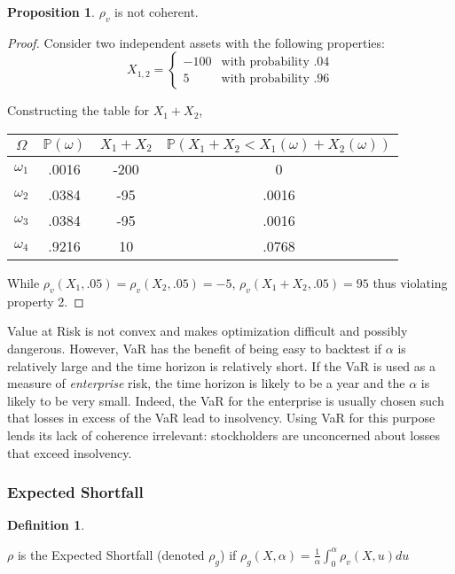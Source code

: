 \documentclass[12pt]{article}
\theoremstyle{definition}
\newtheorem{riskmeasure}{Definition}
\newtheorem{prop}{Proposition}
\begin{document}
\begin{prop}
\(\rho_v\) is not coherent.
\end{prop}
\begin{proof}
Consider two independent assets with the following properties:
\[X_{1, 2}=\begin{cases}
-100 & \text{with probability .04}\\
5 & \text{with probability .96}

\end{cases} \]

Constructing the table for \(X_1+X_2\), 

\begin{center}
\begin{tabular}{c|  c c c}
\(\Omega\) & \(\mathbb{P}(\omega)\) & \(X_1+X_2\) &  \(\mathbb{P}(X_1+X_2 < X_1(\omega)+X_2(\omega))\)  \\
\hline
\(\omega_1\) & .0016 & -200 & 0 \\
\(\omega_2\) & .0384 & -95 & .0016\\
\(\omega_3\) & .0384 & -95 & .0016 \\
\(\omega_4\) & .9216 & 10 & .0768 \\
\end{tabular}
\end{center}


While \(\rho_v (X_1, .05)=\rho_v (X_2, .05)=-5\), \(\rho_v (X_1+X_2, .05)=95\) thus violating property 2.

\end{proof}

Value at Risk is not convex and makes optimization difficult and possibly dangerous. However, VaR has the benefit of being easy to backtest if \(\alpha\) is relatively large and the time horizon is relatively short.  If the VaR is used as a measure of \emph{enterprise} risk, the time horizon is likely to be a year and the \(\alpha\) is likely to be very small.  Indeed, the VaR for the enterprise is usually chosen such that losses in excess of the VaR lead to insolvency.  Using VaR for this purpose lends its lack of coherence irrelevant: stockholders are unconcerned about losses that exceed insolvency.

\subsubsection{Expected Shortfall}

\begin{riskmeasure}\label{defShortfall}

\(\rho\) is the Expected Shortfall (denoted \(\rho_g\)) if \(\rho_g (X, \alpha)=\frac{1}{\alpha}\int_0 ^ \alpha \rho_v(X, u) du\)

\end{riskmeasure}
\end{document}
